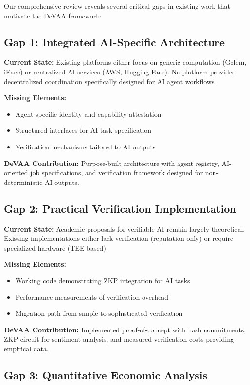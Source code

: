 Our comprehensive review reveals several critical gaps in existing work that motivate the DeVAA framework:

\subsection{Gap 1: Integrated AI-Specific Architecture}

\textbf{Current State:} Existing platforms either focus on generic computation (Golem, iExec) or centralized AI services (AWS, Hugging Face). No platform provides decentralized coordination specifically designed for AI agent workflows.

\textbf{Missing Elements:}
\begin{itemize}
    \item Agent-specific identity and capability attestation
    \item Structured interfaces for AI task specification
    \item Verification mechanisms tailored to AI outputs
\end{itemize}

\textbf{DeVAA Contribution:} Purpose-built architecture with agent registry, AI-oriented job specifications, and verification framework designed for non-deterministic AI outputs.

\subsection{Gap 2: Practical Verification Implementation}

\textbf{Current State:} Academic proposals for verifiable AI remain largely theoretical. Existing implementations either lack verification (reputation only) or require specialized hardware (TEE-based).

\textbf{Missing Elements:}
\begin{itemize}
    \item Working code demonstrating ZKP integration for AI tasks
    \item Performance measurements of verification overhead
    \item Migration path from simple to sophisticated verification
\end{itemize}

\textbf{DeVAA Contribution:} Implemented proof-of-concept with hash commitments, ZKP circuit for sentiment analysis, and measured verification costs providing empirical data.

\subsection{Gap 3: Quantitative Economic Analysis}

